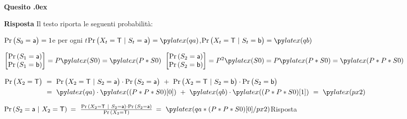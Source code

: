 \documentclass[11pt,twoside,a4paper]{article}
\newcounter{quesito}
\newenvironment{question}{\bigskip\addtocounter{quesito}{1}\bigskip\bigskip\par\textbf{Quesito \thequesito.\kern0ex}}{\par\vspace{\parskip}}
\newenvironment{answer}{\par\textbf{Risposta\quad}}{\par\vspace{\parskip}}
\begin{document}
\begin{question}
\begin{answer}
Il testo riporta le seguenti probabilità:

$\Pr\big(S_0={\sf a}\big)=1$\hfill e per ogni $t$\hfill  $\Pr\big(X_t={\sf T}~|~S_t={\sf a}\big)=\pyl{qa}$,\hfill $\Pr\big(X_t={\sf T}~|~S_t={\sf b}\big)=\pyl{qb}$
\bigskip


$\begin{bmatrix}\Pr(S_1={\sf a})\\\Pr(S_1={\sf b})\end{bmatrix}=P\pyl{S0}=\pyl{P*S0}$
\hfil
$\begin{bmatrix}\Pr(S_2={\sf a})\\\Pr(S_2={\sf b})\end{bmatrix}=P^2\pyl{S0}= P\pyl{P*S0} =\pyl{P*P*S0}$

\medskip
$\Pr\big(X_2={\sf T}\big)\ =\ \Pr\big(X_2={\sf T}~|~S_2={\sf a}\big)\cdot\Pr\big(S_2={\sf a}\big) \ + \ \Pr\big(X_2={\sf T}~|~S_2={\sf b}\big)\cdot\Pr\big(S_2={\sf b}\big)$
\\[2ex]
$\phantom{\Pr\big(X_2={\sf T}\big)}\ =\ \pyl{qa}\cdot\pyl{(P*P*S0)[0]} \ + \ \pyl{qb}\cdot\pyl{(P*P*S0)[1]}\ =\ \pyl{px2}$

\bigskip
{\color{blue}$\Pr(S_2={\sf a}~|~X_2={\sf T})$}$\ =\ \frac{\Pr(X_2={\sf T}~|~S_2={\sf a})\cdot\Pr(S_2={\sf a})}{\Pr(X_2={\sf T})}${\color{blue}$\ =\ \pyl{qa*(P*P*S0)[0]/px2}$\hfill Risposta} 
\end{answer}
\end{question}
\end{document}

